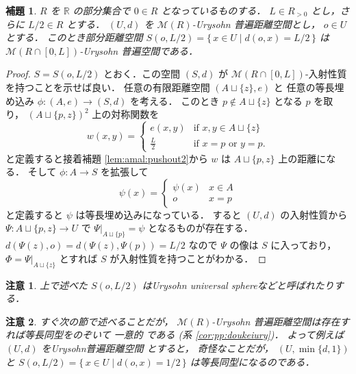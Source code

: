 \documentclass[leqno, 12pt]{jsarticle}
\newtheorem{lem}[thm]{補題}
\newtheorem*{rmk}{注意}
\newcommand{\rr}{\mathbb{R}}
\begin{document}
\begin{lem}\label{lem:diam:sphere}
$R$
を
$\rr$
の部分集合で
$0\in R$
となっているものする．
$L\in R_{>0}$
とし，さらに
$L/2\in R$
とする．
$(U, d)$
を
$\mathscr{M}(R)$-Urysohn
普遍距離空間とし，
 $o\in U$
 とする．
このとき部分距離空間
$S(o, L/2)=\{\,x\in U  \mid d(o, x)=L/2\, \}$
は
$\mathscr{M}(R\cap [0, L])$-Urysohn
普遍空間である．
\end{lem}
\begin{proof}
$S=S(o, L/2)$
とおく．この空間
$({S}, d)$
が
$\mathscr{M}(R\cap[0,  L])$-入射性質
を持つことを示せば良い．
任意の有限距離空間
$(A\sqcup\{z\}, e)$
と
任意の等長埋め込み
$\phi: (A, e)\to ({S}, d)$
を考える．
このとき
$p\not\in A\sqcup \{z\}$
となる
$p$
を取り，
$(A\sqcup\{p, z\})^{2}$
上の対称関数を
\[
w(x, y)=
\begin{cases}
 e(x, y) & \text{if $x, y\in A\sqcup\{z\}$}\\
 \frac{L}{2} & \text{if $x=p$ or $y=p$}. 
\end{cases}
\]
と定義すると接着補題 
\ref{lem:amal:pushout2}から
$w$
は
$A\sqcup\{p, z\}$
上の距離になる．
そして
$\phi\colon  A\to {S}$
を拡張して
\[
\psi(x)=
\begin{cases}
\psi(x) & \text{$x\in A$}\\
o & \text{$x=p$}
\end{cases}
\]
と定義すると
$\psi$
は等長埋め込みになっている．
すると
$(U, d)$
の入射性質から
$\Psi\colon  A\sqcup \{p, z\}\to U$
で
$\Psi|_{A\sqcup\{p\}}=\psi$
となるものが存在する．
$d(\Psi(z), o)=d(\Psi(z), \Psi(p))=L/2$
なので
$\Psi$
の像は
${S}$
に入っており，
$\Phi=\Psi|_{A\sqcup\{z\}}$
とすれば
${S}$
が入射性質を持つことがわかる．
\end{proof}


\begin{rmk}
上で述べた
$S(o, L/2)$
はUrysohn universal sphereなどと呼ばれたりする．
\end{rmk}

\begin{rmk}
すぐ次の節で述べることだが，
$\mathscr{M}(R)$-Urysohn
普遍距離空間は存在すれば等長同型をのぞいて
一意的
である 
(系 
\ref{cor:pp:doukeiury})．
よって例えば
$(U, d)$
をUrysohn普遍距離空間
とすると，
奇怪なことだが，
$(U, \min\{d, 1\})$
と
$S(o, L/2)=\{\,x\in U  \mid d(o, x)=1/2\, \}$
は等長同型になるのである．
\end{rmk}


\end{document}
